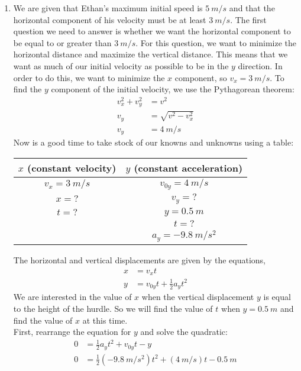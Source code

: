\begin{enumerate}[label=\alph*)]
\item We are given that Ethan's maximum initial speed is $\SI{5}{m/s}$ and that the horizontal component of his velocity must be at least $\SI{3}{m/s}$. The first question we need to answer is whether we want the horizontal component to be equal to or greater than $\SI{3}{m/s}$. For this question, we want to minimize the horizontal distance and maximize the vertical distance. This means that we want as much of our initial velocity as possible to be in the $y$ direction. In order to do this, we want to minimize the $x$ component, so $v_x=\SI{3}{m/s}$. To find the $y$ component of the initial velocity, we use the Pythagorean theorem: 
\begin{align*}
v_x^2+v_y^2&=v^2\\
v_y&=\sqrt{v^2-v_x^2}\\
v_y&=\SI{4}{m/s}
\end{align*}
Now is a good time to take stock of our knowns and unknowns using a table:
\begin{table}[H]
\centering
\label{KnownsUnknownsHurdleProb}
\begin{tabular}{|c|c|}
\hline
\textbf{$x$} (constant velocity)          & \textbf{$y$}  (constant acceleration) \\ \hline
$v_x = \SI{3}{m/s}$          & $v_{0y} = \SI{4}{m/s}$   \\
$x = ?$   & $v_{y} = ?$ \\
$t = ?$ & $y = \SI{0.5}{m}$  \\
                   & $t = ?$                    \\
                 & $a_y = \SI{-9.8}{m/s^2}$                 
\end{tabular}
\end{table}
The horizontal and vertical displacements are given by the equations,
\begin{align*}
x&=v_{x}t\\
y&=v_{0y}t+\frac{1}{2}a_yt^2
\end{align*}
We are interested in the value of $x$ when the vertical displacement $y$ is equal to the height of the hurdle. So we will find the value of $t$ when $y=\SI{0.5}{m}$ and find the value of $x$ at this time.\\
First, rearrange the equation for $y$ and solve the quadratic:
\begin{align*}
0&=\frac{1}{2}a_yt^2+v_{0y}t-y\\
0&=\frac{1}{2}(\SI{-9.8}{m/s^2})t^2+(\SI{4}{m/s})t-\SI{0.5}{m}\\

\end{align*}
\end{enumerate}
